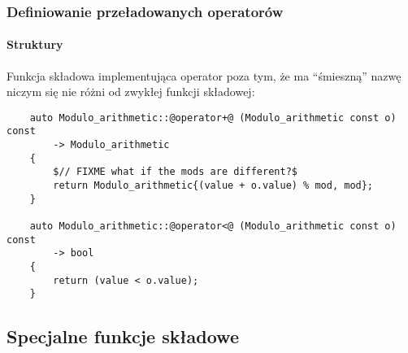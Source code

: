 \documentclass[aspectratio=169,10pt]{beamer}
\begin{document}
\begin{frame}[fragile]
    \frametitle{Definiowanie przeładowanych operatorów}
    \framesubtitle{Struktury}

    Funkcja składowa implementująca operator poza tym, że ma ``śmieszną'' nazwę
    niczym się nie różni od zwykłej funkcji składowej:

    {\scriptsize
    \begin{lstlisting}
    auto Modulo_arithmetic::@operator+@ (Modulo_arithmetic const o) const
        -> Modulo_arithmetic
    {
        $// FIXME what if the mods are different?$
        return Modulo_arithmetic{(value + o.value) % mod, mod};
    }

    auto Modulo_arithmetic::@operator<@ (Modulo_arithmetic const o) const
        -> bool
    {
        return (value < o.value);
    }
    \end{lstlisting}}
\end{frame}

\subsection{Specjalne funkcje składowe}






\end{document}
